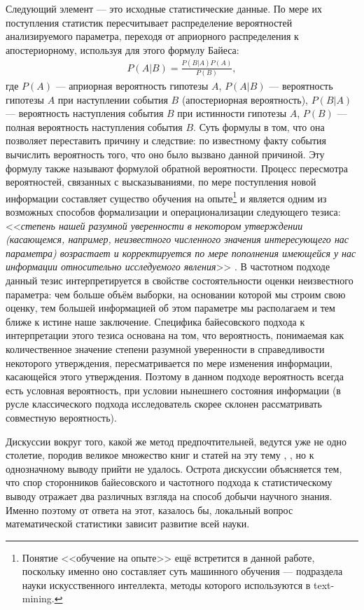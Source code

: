 Следующий элемент --- это исходные статистические данные. По мере их поступления статистик пересчитывает распределение вероятностей анализируемого параметра, переходя от априорного распределения к апостериорному, используя для этого формулу Байеса:
\begin{eqnarray}
P(A|B)=\frac{P(B|A)P(A)}{P(B)},
\end{eqnarray} 
где $P(A)$ --- априорная вероятность гипотезы $A$, $P(A|B)$ --- вероятность гипотезы $A$ при наступлении события $B$ (апостериорная вероятность), $P(B|A)$ --- вероятность наступления события $B$ при истинности гипотезы $A$, $P(B)$ --- полная вероятность наступления события $B$. Суть формулы в том, что она позволяет переставить причину и следствие: по известному факту события вычислить вероятность того, что оно было вызвано данной причиной. Эту формулу также называют формулой обратной вероятности. Процесс пересмотра вероятностей, связанных с высказываниями, по мере поступления новой информации составляет существо обучения на опыте\footnote{Понятие <<обучение на опыте>> ещё встретится в данной работе, поскольку именно оно составляет суть машинного обучения --- подраздела науки искусственного интеллекта, методы которого используются в text-mining.} \cite[стр. 21-22]{Zellner1980} и  является одним из возможных способов формализации и операционализации следующего тезиса: <<\textit{степень нашей разумной уверенности в некотором утверждении (касающемся, например, неизвестного численного значения интересующего нас параметра) возрастает и корректируется по мере пополнения имеющейся у нас информации относительно исследуемого явления}>> \cite[стр. 93]{Aivazyan2008}. В частотном подходе данный тезис интерпретируется в свойстве состоятельности оценки неизвестного параметра: чем больше объём выборки, на основании которой мы строим свою оценку, тем большей информацией об этом параметре мы располагаем и тем ближе к истине наше заключение. Специфика байесовского подхода к интерпретации этого тезиса основана на том, что вероятность, понимаемая как количественное значение степени разумной уверенности в справедливости некоторого утверждения, пересматривается по мере изменения информации, касающейся этого утверждения. Поэтому в данном подходе вероятность всегда есть условная вероятность, при условии нынешнего состояния информации (в русле классического подхода исследователь скорее склонен рассматривать совместную вероятность\cite[стр. 5]{handbook_stat_dm}).

Дискуссии вокруг того, какой же метод предпочтительней, ведутся уже не одно столетие, породив великое множество книг и статей на эту тему \cite{Efron2005}, \cite{Jeffreys1983}, но к однозначному выводу прийти не удалось. Острота дискуссии объясняется тем, что спор сторонников байесовского и частотного подхода к статистическому выводу отражает два различных взгляда на способ добычи научного знания. Именно поэтому от ответа на этот, казалось бы, локальный вопрос математической статистики зависит развитие всей науки.

